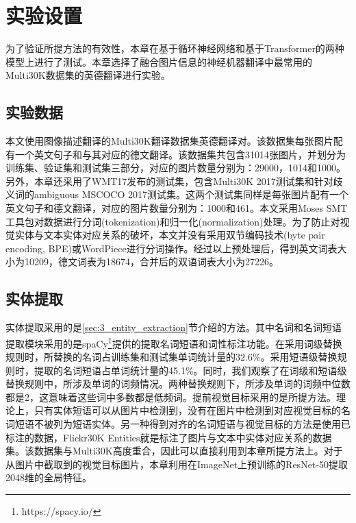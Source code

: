 \section{实验设置}
为了验证所提方法的有效性，本章在基于循环神经网络和基于Transformer的两种模型上进行了测试。本章选择了融合图片信息的神经机器翻译中最常用的Multi30K\cite{43_elliott-etal-2016-multi30k}数据集的英德翻译进行实验。

\subsection{实验数据}
本文使用图像描述翻译的Multi30K翻译数据集英德翻译对。该数据集每张图片配有一个英文句子和与其对应的德文翻译。该数据集共包含31014张图片，并划分为训练集、验证集和测试集三部分，对应的图片数量分别为：29000，1014和1000。另外，本章还采用了WMT17发布的测试集，包含Multi30K 2017测试集和针对歧义词的ambiguous MSCOCO 2017测试集。这两个测试集同样是每张图片配有一个英文句子和德文翻译，对应的图片数量分别为：1000和461。本文采用Moses SMT\cite{44_koehn-etal-2007-moses}工具包对数据进行分词(tokenization)和归一化(normalization)处理。为了防止对视觉实体与文本实体对应关系的破坏，本文并没有采用双节编码技术\cite{27_sennrich-etal-2016-neural}(byte pair encoding, BPE)或WordPiece\cite{28_DBLP:journals/corr/WuSCLNMKCGMKSJL16}进行分词操作。经过以上预处理后，得到英文词表大小为10209，德文词表为18674，合并后的双语词表大小为27226。

\subsection{实体提取}
\label{sec:3_setup_entity_extraction}
实体提取采用的是\ref{sec:3_entity_extraction}节介绍的方法。其中名词和名词短语提取模块采用的是spaCy\footnote{https://spacy.io/}提供的提取名词短语和词性标注功能。在采用词级替换规则时，所替换的名词占训练集和测试集单词统计量的32.6\%。采用短语级替换规则时，提取的名词短语占单词统计量的45.1\%。同时，我们观察了在词级和短语级替换规则中，所涉及单词的词频情况。两种替换规则下，所涉及单词的词频中位数都是2，这意味着这些词中多数都是低频词。提前视觉目标采用的是\cite{24_DBLP:conf/iccv/YangGWHYL19}所提方法。理论上，只有实体短语可以从图片中检测到，没有在图片中检测到对应视觉目标的名词短语不被列为短语实体。另一种得到对齐的名词短语与视觉目标的方法是使用已标注的数据，Flickr30K Entities\cite{29_DBLP:conf/iccv/PlummerWCCHL15,30_DBLP:journals/ijcv/PlummerWCCHL17}就是标注了图片与文本中实体对应关系的数据集。该数据集与Multi30K高度重合，因此可以直接利用到本章所提方法上。对于从图片中截取到的视觉目标图片，本章利用在ImageNet\cite{31_DBLP:journals/ijcv/RussakovskyDSKS15}上预训练的ResNet-50\cite{32_DBLP:conf/cvpr/HeZRS16}提取2048维的全局特征。

